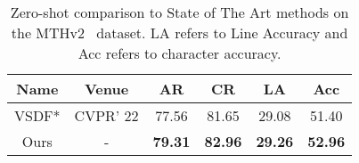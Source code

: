 \begin{table}[]
    \centering
    \caption{Zero-shot comparison to State of The Art methods on the MTHv2~\cite{jla} dataset. LA refers to Line Accuracy and Acc refers to character accuracy.}
    \begin{tabular}{c|c|c|ccc}
        \hline
         Name & Venue & AR & \textbf{CR} & LA & Acc \\
         \hline
         VSDF*\cite{vsdf}& CVPR' 22  &77.56 &81.65 &29.08 & 51.40 \\
         \hline
         Ours&- & \textbf{79.31} &\textbf{82.96}  & \textbf{29.26} & \textbf{52.96} \\
        \hline
    \end{tabular}
    \label{tab:zero_shot}
\end{table}